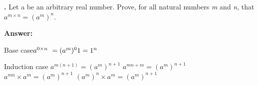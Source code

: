 \documentclass{article}
\newcounter{problem}
\begin{document}
 
\textbf{.} Let a be an arbitrary real number. Prove, for all natural numbers \textit{m} and \textit{n}, that \(a^{m \times n} = (a^m)^n\).

\textbf{Answer:}

Base case\newline \(a^{0 \times n}\ = (a^m)^0
\newline1 = 1^n\)

Induction case\newline
\(a^{m(n+1)} = (a^m)^{n+1}\) \newline
\(a^{mn + m} = (a^m)^{n+1}\) \newline
\(a^{mn} \times a^m = (a^m)^{n+1}\) \newline
\((a^m)^n \times a^m = (a^m)^{n+1}\)
\end{document}
